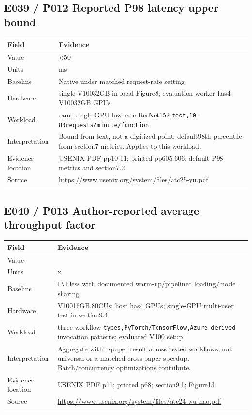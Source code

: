 \subsection*{E039 / P012 Reported P98 latency upper bound}

\begin{longtable}{>{\raggedright\arraybackslash}p{}>{\raggedright\arraybackslash}p{}}
\toprule
\textbf{Field} & \textbf{Evidence}\\\midrule\endhead
Value & <50\\\addlinespace
Units & ms\\\addlinespace
Baseline & Native under matched request-rate setting\\\addlinespace
Hardware & single V10032GB in local Figure8; evaluation worker has4 V10032GB GPUs\\\addlinespace
Workload & same single-GPU low-rate ResNet152 \nolinkurl{test,10-80requests/minute/function}\\\addlinespace
Interpretation & Bound from text, not a digitized point; default98th percentile from section7 metrics. Applies to this workload.\\\addlinespace
Evidence location & USENIX PDF pp10-11; printed pp605-606; default P98 metrics and section7.2\\\addlinespace
Source & \url{https://www.usenix.org/system/files/atc25-yu.pdf}\\\addlinespace
\bottomrule\end{longtable}

\subsection*{E040 / P013 Author-reported average throughput factor}

\begin{longtable}{>{\raggedright\arraybackslash}p{}>{\raggedright\arraybackslash}p{}}
\toprule
\textbf{Field} & \textbf{Evidence}\\\midrule\endhead
Value & 6.7\\\addlinespace
Units & x\\\addlinespace
Baseline & INFless with documented warm-up/pipelined loading/model sharing\\\addlinespace
Hardware & V10016GB,80CUs; host has4 GPUs; single-GPU multi-user test in section9.4\\\addlinespace
Workload & three workflow \nolinkurl{types,PyTorch/TensorFlow,Azure-derived} invocation patterns; evaluated V100 setup\\\addlinespace
Interpretation & Aggregate within-paper result across tested workflows; not universal or a matched cross-paper speedup. Batch/concurrency optimizations contribute.\\\addlinespace
Evidence location & USENIX PDF p11; printed p68; section9.1; Figure13\\\addlinespace
Source & \url{https://www.usenix.org/system/files/atc24-wu-hao.pdf}\\\addlinespace
\bottomrule\end{longtable}

